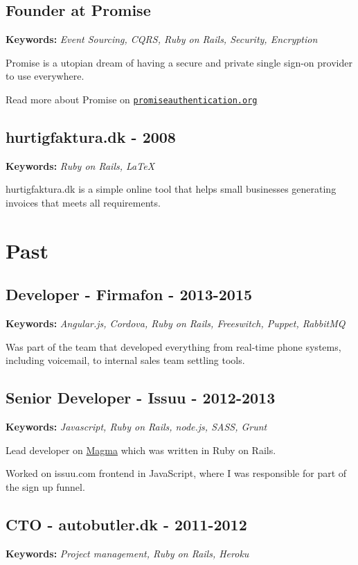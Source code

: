 \documentclass[a4paper]{article}
\newcommand{\keywords}[1]{\small\textbf{Keywords:} \emph{#1}\normalsize}
\begin{document}
\subsection*{Founder at Promise}
\keywords{Event Sourcing, CQRS, Ruby on Rails, Security, Encryption}

Promise is a utopian dream of having a secure and private single sign-on provider to use everywhere.

Read more about Promise on \href{https://promiseauthentication.org}{\tt promiseauthentication.org} \\

\subsection*{hurtigfaktura.dk - 2008}
\keywords{Ruby on Rails, \LaTeX}

hurtigfaktura.dk is a simple online tool that helps small businesses generating invoices that meets all requirements.


\section*{Past}

\subsection*{Developer - Firmafon - 2013-2015}
\keywords{Angular.js, Cordova, Ruby on Rails, Freeswitch, Puppet, RabbitMQ}

Was part of the team that developed everything from real-time phone systems, including voicemail, to internal sales team settling tools.

\subsection*{Senior Developer - Issuu - 2012-2013}
\keywords{Javascript, Ruby on Rails, node.js, SASS, Grunt}

Lead developer on \href{http://www.magmahq.com}{Magma} which was written in Ruby on Rails.

Worked on issuu.com frontend in JavaScript, where I was responsible for part of the sign up funnel.

\subsection*{CTO - autobutler.dk - 2011-2012}
\keywords{Project management, Ruby on Rails, Heroku}
\end{document}

